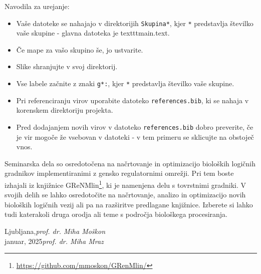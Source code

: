 \preface

Navodila za urejanje: 
\begin{itemize}
\item Vaše datoteke se nahajajo v direktorijih \texttt{Skupina*}, kjer \texttt{*} predstavlja številko vaše skupine - glavna datoteka je texttt{main.text}.
\item Če mape za vašo skupino še, jo ustvarite.
\item Slike shranjujte v svoj direktorij.
\item Vse labele začnite z znaki \texttt{g*:}, kjer \texttt{*} predstavlja številko vaše skupine.
\item Pri referenciranju virov uporabite datoteko \texttt{references.bib}, ki se nahaja v korenskem direktoriju projekta.
\item Pred dodajanjem novih virov v datoteko \texttt{references.bib} dobro preverite, če je vir mogoče že vsebovan v datoteki - v tem primeru se sklicujte na obstoječ vnos.
\end{itemize}

Seminarska dela so osredotočena na načrtovanje in optimizacijo bioloških logičnih gradnikov implementiranimi z gensko regulatornimi omrežji. Pri tem boste izhajali iz knjižnice GReNMlin\footnote{\url{https://github.com/mmoskon/GRenMlin/}}, ki je namenjena delu s tovrstnimi gradniki. V svojih delih se lahko osredotočite na načrtovanje, analizo in optimizacijo novih bioloških logičnih vezij ali pa na razširitve predlagane knjižnice. Izberete si lahko tudi katerakoli druga orodja ali teme s področja biološkega procesiranja.

\vspace{\baselineskip}
\begin{flushright}\noindent
Ljubljana,\hfill {\it prof. dr. Miha Moškon}\\
januar, 2025\hfill {\it prof. dr. Miha Mraz}\\
\end{flushright}


